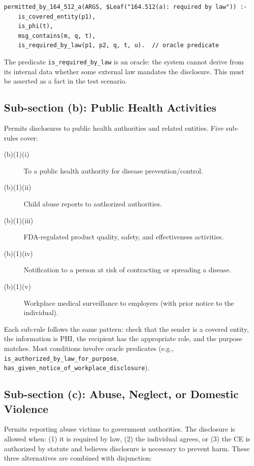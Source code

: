 \documentclass[11pt,letterpaper]{article}
\begin{document}
\begin{lstlisting}[style=soufflestyle,caption={\S 512(a): Required by law}]
permitted_by_164_512_a(ARGS, $Leaf("164.512(a): required by law")) :-
    is_covered_entity(p1),
    is_phi(t),
    msg_contains(m, q, t),
    is_required_by_law(p1, p2, q, t, u).  // oracle predicate
\end{lstlisting}

The predicate \texttt{is\_required\_by\_law} is an oracle: the system cannot derive from its internal data whether some external law mandates the disclosure. This must be asserted as a fact in the test scenario.

\subsection{Sub-section (b): Public Health Activities}

Permits disclosures to public health authorities and related entities. Five sub-rules cover:

\begin{description}
  \item[(b)(1)(i)] To a public health authority for disease prevention/control.
  \item[(b)(1)(ii)] Child abuse reports to authorized authorities.
  \item[(b)(1)(iii)] FDA-regulated product quality, safety, and effectiveness activities.
  \item[(b)(1)(iv)] Notification to a person at risk of contracting or spreading a disease.
  \item[(b)(1)(v)] Workplace medical surveillance to employers (with prior notice to the individual).
\end{description}

Each sub-rule follows the same pattern: check that the sender is a covered entity, the information is PHI, the recipient has the appropriate role, and the purpose matches. Most conditions involve oracle predicates (e.g., \texttt{is\_authorized\_by\_law\_for\_purpose}, \texttt{has\_given\_notice\_of\_workplace\_disclosure}).

\subsection{Sub-section (c): Abuse, Neglect, or Domestic Violence}

Permits reporting abuse victims to government authorities. The disclosure is allowed when: (1) it is required by law, (2) the individual agrees, or (3) the CE is authorized by statute and believes disclosure is necessary to prevent harm. These three alternatives are combined with disjunction:
\end{document}
